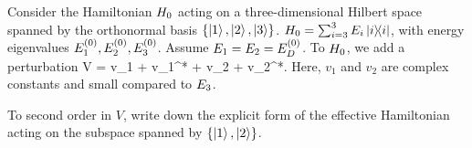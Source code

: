 \newcommand{\kq}{\ket{1}}
\newcommand{\kw}{\ket{2}}
\newcommand{\ke}{\ket{3}}

\newcommand{\vq}{v_1}
\newcommand{\vw}{v_2}
\newcommand{\ve}{v_3}

\newcommand{\vqs}{\vq^*}
\newcommand{\vws}{\vw^*}

\newcommand{\Heff}{H_\text{eff}}
\newcommand{\Eo}{E\suo}
\newcommand{\Eod}{\Eo_D}

\newcommand{\Pq}{P_1}

\clearpage
\begin{statement}{}
	Consider the Hamiltonian $H_0$ acting on a three-dimensional Hilbert space spanned by the orthonormal basis $\{\kq, \kw, \ke\}$.  $H_0 = \sum_{i = 3}^3 E_i \ketbra{i}$, with energy eigenvalues $E^{(0)}_1, E^{(0)}_2, E^{(0)}_3$.  Assume $\Eq = \Ew = \Eod$.  To $H_0$, we add a perturbation
	\beq
		V = \vq {} + \vqs {} + \vw {} + \vws {}.
	\eeq
	Here, $\vq$ and $\vw$ are complex constants and small compared to $E_3$.
\end{statement}

\begin{problem}
	To second order in $V$, write down the explicit form of the effective Hamiltonian acting on the subspace spanned by $\{\kq, \kw\}$.
\end{problem}


